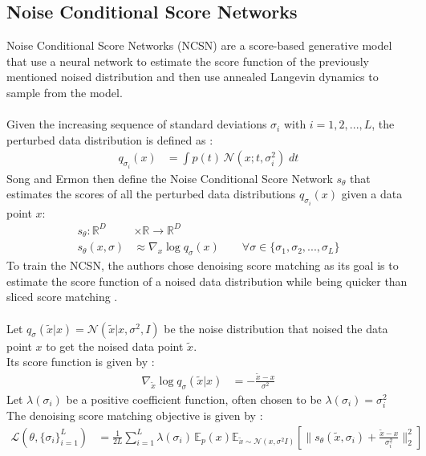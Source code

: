 \documentclass[twoside]{article}
\numberwithin{equation}{section}
\numberwithin{figure}{section}
\begin{document}
\subsection{Noise Conditional Score Networks}
Noise Conditional Score Networks (NCSN) are a score-based generative model that use a neural network to estimate the score function of the previously mentioned noised distribution and then use annealed Langevin dynamics to sample from the model. \cite{song2020generative}
\\\\
Given the increasing sequence of standard deviations $\sigma_i$ with $i = 1, 2, ..., L$, the perturbed data distribution is defined as \cite{song2020generative}:
\begin{align}
  q_{\sigma_i}(x) &= \int p(t) \, \mathcal{N}(x; t, \sigma_i^2) \; dt
\end{align}
Song and Ermon \cite{song2020generative} then define the Noise Conditional Score Network $s_\theta$ that estimates the scores of all the perturbed data distributions $q_{\sigma_i}(x)$ given a data point $x$:
\begin{align}
  s_\theta : \mathbb{R}^D &\times \mathbb{R} \rightarrow \mathbb{R}^D \\
  s_\theta (x, \sigma) &\approx \nabla_x \log q_\sigma (x) \qquad \forall \sigma \in \{ \sigma_1, \sigma_2, ..., \sigma_L \}
\end{align}
To train the NCSN, the authors chose denoising score matching \cite{vincent2010denoising} as its goal is to estimate the score function of a noised data distribution while being quicker than sliced score matching \cite{song2019sliced}. \cite{song2020generative}
\\\\
Let $q_\sigma (\tilde{x} | x) = \mathcal{N}(\tilde{x} | x, \sigma^2, I)$ be the noise distribution that noised the data point $x$ to get the noised data point $\tilde{x}$. \\
Its score function is given by \cite{song2020generative}:
\begin{align}
  \nabla_{\tilde{x}} \log q_\sigma (\tilde{x} | x) &= - \frac{\tilde{x} - x}{\sigma^2} 
\end{align}
Let $\lambda (\sigma_i)$ be a positive coefficient function, often chosen to be $\lambda (\sigma_i) = \sigma_i^2$ \cite{songblog, song2020generative} \\
The denoising score matching objective is given by \cite{song2020generative}:
\begin{align}
  \mathcal{L}(\theta, \{ \sigma_i \}_{i=1}^L) &= \frac{1}{2L} \sum^L_{i=1} \lambda(\sigma_i) \, \mathbb{E}_p(x) \mathbb{E}_{\tilde{x} \sim \mathcal{N}(x, \sigma^2 I)} \left[ \| s_\theta (\tilde{x}, \sigma_i) + \frac{\tilde{x} - x}{\sigma_i^2} \|_2^2 \right]
\end{align}
\end{document}
